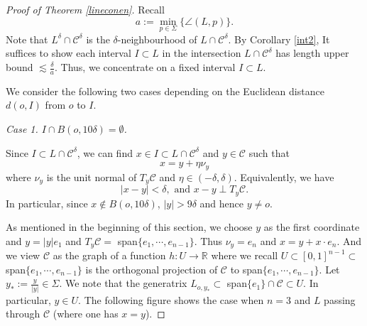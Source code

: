 \documentclass[11pt,a4paper,reqno]{amsart}
\newcommand{\R}{\mathbb{R}}
\newcommand{\calL}{\mathcal{L}}
\newcommand{\calC}{\mathcal{C}}
\newcommand{\1}{\mathbf{1}}
\newcommand{\diam}{\operatorname{diam}}
\numberwithin{equation}{section}
\theoremstyle{plain}
\theoremstyle{definition}
\theoremstyle{remark}
\begin{document}
\begin{proof}[Proof of Theorem \ref{lineconen}]
    Recall
    $$ a:= \min_{p \in \Sigma}\{ \angle(L,p) \}. $$
    Note that $L^\delta \cap \calC^\delta$ is the $\delta$-neighbourhood of $L \cap \calC^\delta$.
    By
     Corollary \ref{int2},
     It suffices to show each interval $I \subset L$ in the intersection $L \cap \calC^\delta$ has length upper bound $\lesssim \frac{\delta}{a}$.
     Thus,
     we concentrate on a fixed interval $I \subset L$.

    We consider the following two cases depending on the Euclidean distance $d(o,I)$ from $o$ to $I$.

    \medskip
    \emph{Case 1. $I \cap B(o,10 \delta) = \emptyset$.}

    Since $I \subset L \cap \calC^\delta$, we can find $x\in I \subset L \cap \calC^\delta$ and $y \in \calC$ such that
    $$  x = y + \eta \nu_y  $$
    where $\nu_y$ is the unit normal of $T_y\calC$ and $\eta \in (-\delta, \delta)$.
    Equivalently, we have
    \begin{equation}\label{x}
       |x-y| < \delta, \mbox{ and } x-y \perp T_y\calC.
    \end{equation}
    In particular, since $x \notin B(o,10 \delta)$, $|y| > 9 \delta$ and hence $y \ne o$.

    As mentioned in the beginning of this section, we choose $y$ as the first coordinate and $y = |y|e_1$ and $T_y\calC=$ span$\{e_1, \cdots, e_{n-1}\}$. Thus $\nu_y= e_n$ and $x = y+ x \cdot e_n$.
    And we view $\calC$ as the graph of a function $h:U \to \R$ where we recall $U \subset [0,1]^{n-1}\subset$ span$\{e_1,\cdots,e_{n-1}\}$ is the orthogonal projection of $\calC$ to span$\{e_1,\cdots,e_{n-1}\}$.
    Let $y_\ast:= \frac{y}{|y|} \in \Sigma$. We note that the generatrix $L_{o,y_\ast} \subset$ span$\{e_1\}\cap \calC \subset U$. In particular, $y \in U$. The following figure shows the case when $n=3$ and $L$ passing through $\calC$ (where one has $x=y$).


\end{proof}
\end{document}
